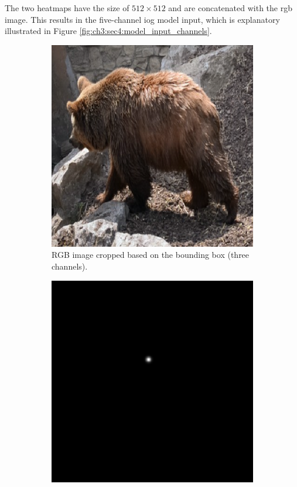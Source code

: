 The two heatmaps have the size of $512 \times 512$  and are concatenated with the \Gls{rgb} image.
This results in the five-channel \gls{iog} model input, which is explanatory illustrated in Figure \ref{fig:ch3:sec4:model_input_channels}.

\begin{figure}
	\centering
	\begin{subfigure}[b]{0.3\textwidth}
		\centering
		\includegraphics[width=\textwidth]{figures/chap34_channel_rgb.png}
		\caption{RGB image cropped based on the bounding box (three channels).}
		\label{fig:ch3:sec4:rgb_channel}
	\end{subfigure}
	\hfill
	\begin{subfigure}[b]{0.3\textwidth}
		\centering
		\includegraphics[width=\textwidth]{figures/chap34_channel_fg.png}

\end{subfigure}
\end{figure}
